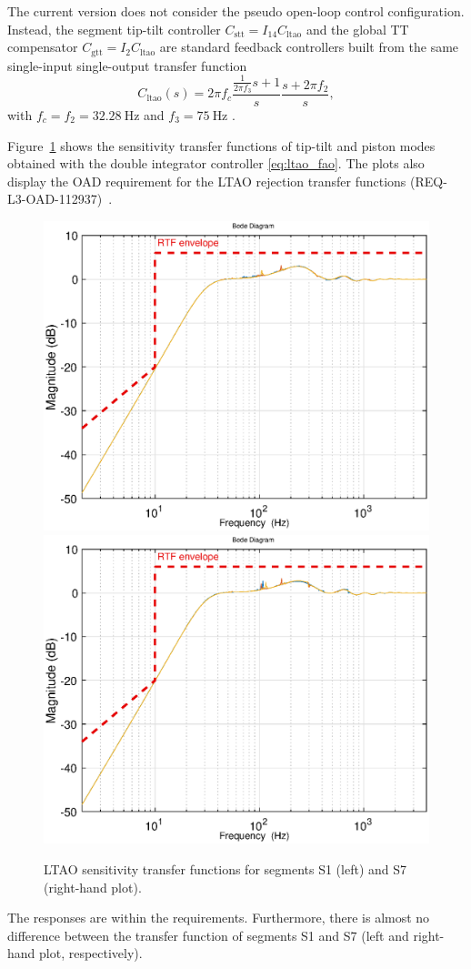 \documentclass{gmto}
\begin{document}
The current version does not consider the pseudo open-loop control configuration. Instead, the segment tip-tilt controller $C_\text{stt} = I_{14}C_\text{ltao}$ and the global TT compensator $C_\text{gtt} = I_{2}C_\text{ltao}$ are standard feedback controllers built from the same single-input single-output transfer function
\begin{equation} \label{eq:ltao_fao}
    C_\text{ltao}(s) = 2\pi f_c \frac{ {\frac{1}{2\pi f_3}}s +1}{s}\frac{s+ 2\pi f_2}{s} ,
\end{equation}
with $f_c = f_2 = \SI{32.28}{\hertz}$ and $f_3 = \SI{75}{\hertz}$ \cite{PT_IM_Jun2022}.

Figure~\ref{fig:ltao_rtf_plots} shows the sensitivity transfer functions of tip-tilt and piston modes obtained with the double integrator controller \eqref{eq:ltao_fao}. The plots also display the OAD requirement for the LTAO rejection transfer functions (REQ-L3-OAD-112937)~\cite{OAD}.
\begin{figure}[!hbt]
  \centering
  \includegraphics[width=.495\textwidth]{m2s1_ltao_rtf.eps}
  \includegraphics[width=.495\textwidth]{m2s7_ltao_rtf.eps}
  \caption[LTAO sensitivity transfer functions]{LTAO sensitivity transfer functions for segments S1 (left) and S7 (right-hand plot).}
  \label{fig:ltao_rtf_plots}
\end{figure}
The responses are within the requirements. Furthermore, there is almost no difference between the transfer function of segments S1 and S7 (left and right-hand plot, respectively).
\end{document}
